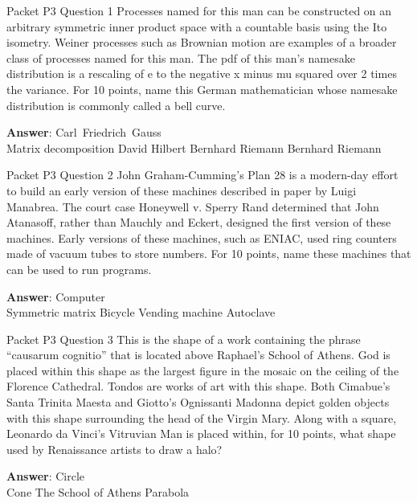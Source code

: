\begin{frame}{Packet P3 Question 1}
Processes named for this   man can be constructed on an arbitrary symmetric inner product space with a countable basis using   the Ito isometry. Weiner processes such as Brownian motion are examples of a broader class of processes named for this man. The pdf of this man's namesake distribution is a rescaling of e to the negative x minus mu squared over 2 times the variance. For 10 points, name this German mathematician whose   namesake distribution is commonly called   a bell curve.    

\textbf{Answer}: Carl\ Friedrich\ Gauss\\
 Matrix decomposition
 David Hilbert
 Bernhard Riemann
 Bernhard Riemann
\end{frame}

\begin{frame}{Packet P3 Question 2}
John   Graham-Cumming's Plan 28 is a modern-day effort to build an early version of these machines described in paper by Luigi Manabrea. The court case Honeywell v. Sperry Rand determined that John Atanasoff, rather than Mauchly and Eckert, designed the first version of these machines. Early versions of these machines, such as ENIAC, used ring counters made of vacuum tubes to store numbers. For 10 points, name these machines that can be used to run programs.      

\textbf{Answer}: Computer\\
 Symmetric matrix
 Bicycle
 Vending machine
 Autoclave
\end{frame}

\begin{frame}{Packet P3 Question 3}
This is the shape of a   work containing the phrase ``causarum cognitio''     that is located above Raphael's School of Athens. God is placed within this shape as the largest figure in the mosaic on the ceiling of the Florence Cathedral. Tondos are works of art with this shape. Both Cimabue's Santa Trinita Maesta and Giotto's Ognissanti Madonna depict golden objects with this shape surrounding the head of the Virgin Mary. Along with a square, Leonardo da Vinci's Vitruvian Man is placed within, for 10 points, what shape used by Renaissance artists to draw a halo?  

\textbf{Answer}: Circle\\
 Cone
 The School of Athens
 Parabola
\end{frame}

